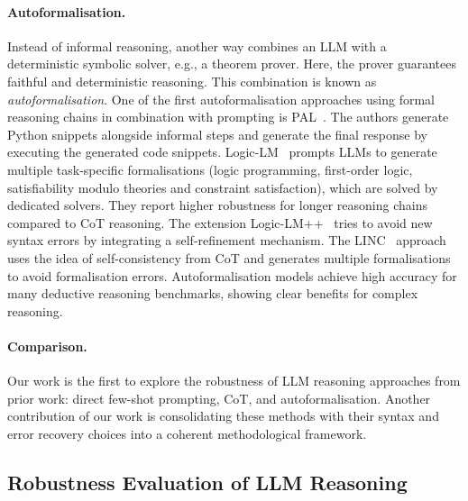 \paragraph{Autoformalisation.} 
Instead of informal reasoning, another way combines an \ac{LLM} with a deterministic symbolic solver, e.g., a theorem prover. 
Here, the prover guarantees faithful and deterministic reasoning.
This combination is known as \emph{autoformalisation}.
One of the first autoformalisation approaches using formal reasoning chains in combination with prompting is PAL~\cite{gao_pal_2023}. 
The authors generate Python snippets alongside informal steps and generate the final response by executing the generated code snippets.  
Logic-LM~\cite{liangming_pan_logiclm_2023} prompts \acp{LLM} to generate multiple task-specific formalisations (logic programming, first-order logic, satisfiability modulo theories and constraint satisfaction), which are solved by dedicated solvers. 
They report higher robustness for longer reasoning chains compared to \ac{CoT} reasoning.
The extension Logic-LM++~\cite{kirtania_logic-lm_2024} tries to avoid new syntax errors by integrating a self-refinement mechanism.
The LINC~\cite{olausson_linc_2023} approach uses the idea of self-consistency from \ac{CoT} and generates multiple formalisations to avoid formalisation errors. 
Autoformalisation models achieve high accuracy for many deductive reasoning benchmarks, showing clear benefits for complex reasoning.

\paragraph{Comparison.} Our work is the first to explore the robustness of \ac{LLM} reasoning approaches from prior work: direct few-shot prompting, \ac{CoT}, and autoformalisation. Another contribution of our work is consolidating these methods with their syntax and error recovery choices into a coherent methodological framework.

\subsection{Robustness Evaluation of LLM Reasoning}
